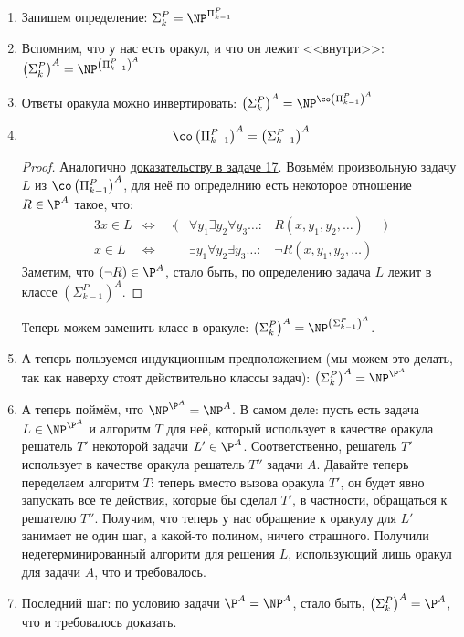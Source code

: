 	\begin{enumerate}
		\item
			Запишем определение: $\Sigma_k^P = \NP^{\Pi_{k-1}^P}$
		\item
			Вспомним, что у нас есть оракул, и что он лежит <<внутри>>: $\left(\Sigma_k^P\right)^A = \NP^{\left(\Pi_{k-1}^P\right)^A}$
		\item
			Ответы оракула можно инвертировать: $\left(\Sigma_k^P\right)^A = \NP^{\co\left(\Pi_{k-1}^P\right)^A}$
		\item
			\begin{lemma}
				\[ \co\left(\Pi_{k-1}^P\right)^A = \left(\Sigma_{k-1}^P\right)^A \]
			\end{lemma}
			\begin{proof}
				Аналогично \hyperref[prob17_quantors]{доказательству в задаче 17}.
				Возьмём произвольную задачу $L$ из $\co\left(\Pi_{k-1}^P\right)^A$, для неё по определнию есть некоторое отношение $R \in \P^A$ такое, что:
				\begin{alignat*}{3}
					x \in L &\iff& \lnot(&\forall y_1 \exists y_2 \forall y_3 \dots \colon &      R(x, y_1, y_2, \dots)&) \\
					x \in L &\iff&       &\exists y_1 \forall y_2 \exists y_3 \dots \colon &\lnot R(x, y_1, y_2, \dots)&
				\end{alignat*}
				Заметим, что $(\lnot R) \in \P^A$, стало быть, по определению задача $L$ лежит в классе $\left(\Sigma_{k-1}^P\right)^A$.
			\end{proof}
			Теперь можем заменить класс в оракуле: $\left(\Sigma_k^P\right)^A = \NP^{\left(\Sigma_{k-1}^P\right)^A}$.
		\item
			А теперь пользуемся индукционным предположением (мы можем это делать, так как наверху стоят действительно классы задач):
			$\left(\Sigma_k^P\right)^A = \NP^{\P^A}$
		\item
			А теперь поймём, что $\NP^{\P^A}=\NP^A$.
			В самом деле: пусть есть задача $L\in \NP^{\P^A}$ и алгоритм $T$ для неё, который использует в качестве оракула решатель $T'$ некоторой задачи $L'\in \P^A$.
			Соответственно, решатель $T'$ использует в качестве оракула решатель $T''$ задачи $A$.
			Давайте теперь переделаем алгоритм $T$: теперь вместо вызова оракула $T'$, он будет явно запускать все те действия, которые бы сделал $T'$,
			в частности, обращаться к решателю $T''$.
			Получим, что теперь у нас обращение к оракулу для $L'$ занимает не один шаг, а какой-то полином, ничего страшного.
			Получили недетерминированный алгоритм для решения $L$, использующий лишь оракул для задачи $A$, что и требовалось.
		\item
			Последний шаг: по условию задачи $\P^A=\NP^A$, стало быть, $\left(\Sigma_k^P\right)^A = \P^A$, что и требовалось доказать.
	\end{enumerate}

